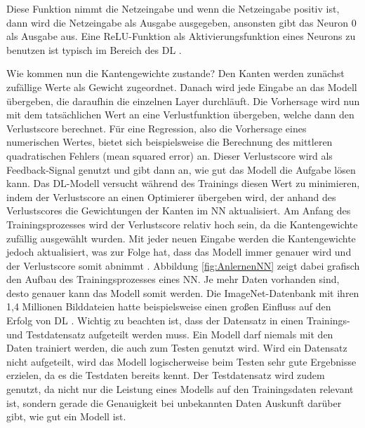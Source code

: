 Diese Funktion nimmt die Netzeingabe und wenn die Netzeingabe positiv ist, dann wird die Netzeingabe als Ausgabe ausgegeben, ansonsten gibt das Neuron 0 als Ausgabe aus.
Eine \ac{ReLU}-Funktion als Aktivierungsfunktion eines Neurons zu benutzen ist typisch im Bereich des \ac{DL} \cite[vgl. S.31]{NN}.

Wie kommen nun die Kantengewichte zustande? Den Kanten werden zunächst zufällige Werte als Gewicht zugeordnet. Danach wird jede Eingabe an das Modell übergeben, die
daraufhin die einzelnen Layer durchläuft. Die Vorhersage wird nun mit dem tatsächlichen Wert an eine Verlustfunktion übergeben, welche dann den Verlustscore berechnet.
Für eine Regression, also die Vorhersage eines numerischen Wertes, bietet sich beispielsweise die Berechnung des mittleren quadratischen Fehlers (mean squared error) an.
Dieser Verlustscore wird als Feedback-Signal genutzt und gibt dann an, wie gut das Modell die Aufgabe lösen kann. Das \ac{DL}-Modell versucht während des Trainings diesen 
Wert zu minimieren, indem der Verlustscore an einen Optimierer übergeben wird, der anhand des Verlustscores die Gewichtungen der Kanten im \ac{NN} aktualisiert.
Am Anfang des Trainingsprozesses wird der Verlustscore relativ hoch sein, da die Kantengewichte zufällig ausgewählt wurden. Mit jeder neuen Eingabe werden die Kantengewichte
jedoch aktualisiert, was zur Folge hat, dass das Modell immer genauer wird und der Verlustscore somit abnimmt \cite[vgl. S.30ff.]{DL_PY}.
Abbildung \ref*{fig:AnlernenNN} zeigt dabei grafisch den Aufbau des Trainingsprozesses eines \ac{NN}. Je mehr Daten vorhanden sind, desto genauer kann das 
Modell somit werden. Die ImageNet-Datenbank mit ihren 1,4 Millionen Bilddateien hatte beispielsweise einen großen Einfluss auf den Erfolg von \ac{DL} \cite[vgl. S.45]{DL_PY}.
Wichtig zu beachten ist, dass der Datensatz in einen Trainings- und Testdatensatz aufgeteilt werden muss. Ein Modell darf niemals mit den Daten trainiert werden,
die auch zum Testen genutzt wird. Wird ein Datensatz nicht aufgeteilt, wird das Modell logischerweise beim Testen sehr gute Ergebnisse erzielen, da es die 
Testdaten bereits kennt. Der Testdatensatz wird zudem genutzt, da nicht nur die Leistung eines Modells auf den Trainingsdaten relevant ist, sondern gerade 
die Genauigkeit bei unbekannten Daten Auskunft darüber gibt, wie gut ein Modell ist. 

